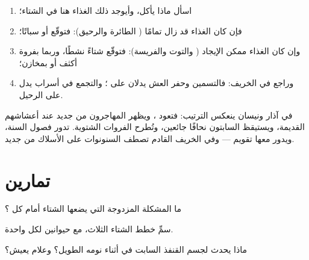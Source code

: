 \begin{method}\label{met:g3:animals-through-seasons:guess}
\begin{enumerate}
  \item اسأل ماذا يأكل، وأيوجد ذلك الغذاء هنا في الشتاء؛
  \item فإن كان الغذاء قد زال تمامًا ( الطائرة والرحيق):
        فتوقّع  أو سباتًا؛
  \item وإن كان الغذاء ممكن الإيجاد ( والتوت والفريسة):
        فتوقّع شتاءً نشطًا، وربما بفروة أكثف أو بمخازن؛
  \item وراجع في الخريف: فالتسمين وحفر العش يدلان على ؛
        والتجمع في أسراب يدل على الرحيل.
\end{enumerate}
\end{method}

\begin{example}\label{ex:g3:animals-through-seasons:spring}
في آذار ونيسان ينعكس الترتيب: فتعود ، ويظهر المهاجرون من
جديد عند أعشاشهم القديمة، ويستيقظ السابتون نحافًا جائعين، وتُطرح
الفروات الشتوية. تدور فصول السنة، ويدور معها تقويم  ---
وفي الخريف القادم تصطف السنونوات على الأسلاك من جديد.
\end{example}

\section{تمارين}

\begin{exercise}[$\star$]\label{exo:g3:animals-through-seasons:1}
ما المشكلة المزدوجة التي يضعها الشتاء أمام كل ؟
\end{exercise}

\begin{exercise}[$\star$]\label{exo:g3:animals-through-seasons:2}
سمِّ خطط الشتاء الثلاث، مع حيوانين لكل واحدة.
\end{exercise}

\begin{exercise}[$\star$]\label{exo:g3:animals-through-seasons:3}
ماذا يحدث لجسم القنفذ السابت في أثناء نومه الطويل؟ وعلام يعيش؟
\end{exercise}


